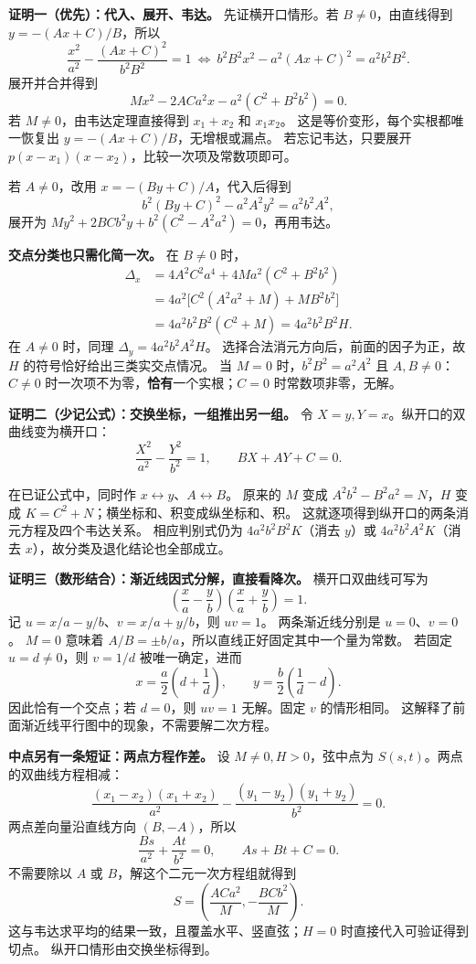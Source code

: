 \begin{proofbox}
\textbf{证明一（优先）：代入、展开、韦达。}
先证横开口情形。若 $B\ne0$，由直线得到 $y=-(Ax+C)/B$，所以
\[
 \frac{x^2}{a^2}-\frac{(Ax+C)^2}{b^2B^2}=1
 \ \Longleftrightarrow\
 b^2B^2x^2-a^2(Ax+C)^2=a^2b^2B^2.
\]
展开并合并得到
\[
 Mx^2-2ACa^2x-a^2(C^2+B^2b^2)=0.
\]
若 $M\ne0$，由韦达定理直接得到 $x_1+x_2$ 和 $x_1x_2$。
这是等价变形，每个实根都唯一恢复出 $y=-(Ax+C)/B$，无增根或漏点。
若忘记韦达，只要展开 $p(x-x_1)(x-x_2)$，比较一次项及常数项即可。

若 $A\ne0$，改用 $x=-(By+C)/A$，代入后得到
\[
 b^2(By+C)^2-a^2A^2y^2=a^2b^2A^2,
\]
展开为 $My^2+2BCb^2y+b^2(C^2-A^2a^2)=0$，再用韦达。

\textbf{交点分类也只需化简一次。} 在 $B\ne0$ 时，
\[
 \begin{aligned}
 \Delta_x
 &=4A^2C^2a^4+4Ma^2(C^2+B^2b^2)\\
 &=4a^2\bigl[C^2(A^2a^2+M)+MB^2b^2\bigr]\\
 &=4a^2b^2B^2(C^2+M)=4a^2b^2B^2H.
 \end{aligned}
\]
在 $A\ne0$ 时，同理 $\Delta_y=4a^2b^2A^2H$。
选择合法消元方向后，前面的因子为正，故 $H$ 的符号恰好给出三类实交点情况。
当 $M=0$ 时，$b^2B^2=a^2A^2$ 且 $A,B\ne0$：$C\ne0$ 时一次项不为零，\textbf{恰有}一个实根；$C=0$ 时常数项非零，无解。
\end{proofbox}
\clearpage
\begin{proofbox}
\textbf{证明二（少记公式）：交换坐标，一组推出另一组。}
令 $X=y,Y=x$。纵开口的双曲线变为横开口：
\[
 \frac{X^2}{a^2}-\frac{Y^2}{b^2}=1,\qquad BX+AY+C=0.
\]

在已证公式中，同时作 $x\leftrightarrow y$、$A\leftrightarrow B$。
原来的 $M$ 变成 $A^2b^2-B^2a^2=N$，$H$ 变成 $K=C^2+N$；横坐标和、积变成纵坐标和、积。
这就逐项得到纵开口的两条消元方程及四个韦达关系。
相应判别式仍为 $4a^2b^2B^2K$（消去 $y$）或 $4a^2b^2A^2K$（消去 $x$），故分类及退化结论也全部成立。
\end{proofbox}
\clearpage
\begin{proofbox}
\textbf{证明三（数形结合）：渐近线因式分解，直接看降次。}
横开口双曲线可写为
\[
 \left(\frac{x}{a}-\frac{y}{b}\right)
 \left(\frac{x}{a}+\frac{y}{b}\right)=1.
\]
记 $u=x/a-y/b$、$v=x/a+y/b$，则 $uv=1$。
两条渐近线分别是 $u=0$、$v=0$。
$M=0$ 意味着 $A/B=\pm b/a$，所以直线正好固定其中一个量为常数。
若固定 $u=d\ne0$，则 $v=1/d$ 被唯一确定，进而
\[
 x=\frac a2\left(d+\frac1d\right),\qquad
 y=\frac b2\left(\frac1d-d\right).
\]
因此恰有一个交点；若 $d=0$，则 $uv=1$ 无解。固定 $v$ 的情形相同。
这解释了前面渐近线平行图中的现象，不需要解二次方程。

\textbf{中点另有一条短证：两点方程作差。}
设 $M\ne0,H>0$，弦中点为 $S(s,t)$。两点的双曲线方程相减：
\[
 \frac{(x_1-x_2)(x_1+x_2)}{a^2}
 -\frac{(y_1-y_2)(y_1+y_2)}{b^2}=0.
\]
两点差向量沿直线方向 $(B,-A)$，所以
\[
 \frac{Bs}{a^2}+\frac{At}{b^2}=0,\qquad As+Bt+C=0.
\]
不需要除以 $A$ 或 $B$，解这个二元一次方程组就得到
\[
 S=\left(\frac{ACa^2}{M},-\frac{BCb^2}{M}\right).
\]
这与韦达求平均的结果一致，且覆盖水平、竖直弦；$H=0$ 时直接代入可验证得到切点。
纵开口情形由交换坐标得到。
\end{proofbox}
